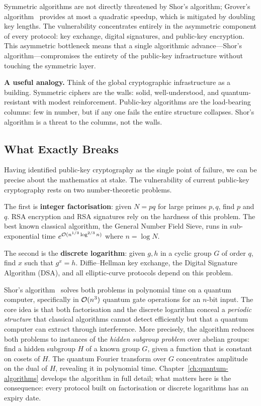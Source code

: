 Symmetric algorithms are not directly threatened by Shor's algorithm; Grover's algorithm~\cite{Grover1996} provides at most a quadratic speedup, which is mitigated by doubling key lengths.  The vulnerability concentrates entirely in the asymmetric component of every protocol: key exchange, digital signatures, and public-key encryption.  This asymmetric bottleneck means that a single algorithmic advance---Shor's algorithm---compromises the entirety of the public-key infrastructure without touching the symmetric layer.

\begin{svgraybox}
\textbf{A useful analogy.}  Think of the global cryptographic infrastructure as a building.  Symmetric ciphers are the walls: solid, well-understood, and quantum-resistant with modest reinforcement.  Public-key algorithms are the load-bearing columns: few in number, but if any one fails the entire structure collapses.  Shor's algorithm is a threat to the columns, not the walls.
\end{svgraybox}

\subsection{What Exactly Breaks}

Having identified public-key cryptography as the single point of failure, we can be precise about the mathematics at stake.  The vulnerability of current public-key cryptography rests on two number-theoretic problems.

The first is \textbf{integer factorisation}: given $N = pq$ for large primes $p, q$, find $p$ and $q$.  RSA encryption and RSA signatures rely on the hardness of this problem.  The best known classical algorithm, the General Number Field Sieve, runs in sub-exponential time $e^{\mathcal{O}(n^{1/3}\log^{2/3}n)}$ where $n = \log N$.

The second is the \textbf{discrete logarithm}: given $g, h$ in a cyclic group $G$ of order $q$, find $x$ such that $g^x = h$.  Diffie--Hellman key exchange, the Digital Signature Algorithm (DSA), and all elliptic-curve protocols depend on this problem.

Shor's algorithm~\cite{Shor1994, Shor1997} solves both problems in polynomial time on a quantum computer, specifically in $\mathcal{O}(n^3)$ quantum gate operations for an $n$-bit input.  The core idea is that both factorisation and the discrete logarithm conceal a \emph{periodic structure} that classical algorithms cannot detect efficiently but that a quantum computer can extract through interference.  More precisely, the algorithm reduces both problems to instances of the \emph{hidden subgroup problem} over abelian groups: find a hidden subgroup $H$ of a known group $G$, given a function that is constant on cosets of $H$.  The quantum Fourier transform over $G$ concentrates amplitude on the dual of $H$, revealing it in polynomial time.  Chapter~\ref{ch:quantum-algorithms} develops the algorithm in full detail; what matters here is the consequence: every protocol built on factorisation or discrete logarithms has an expiry date.

